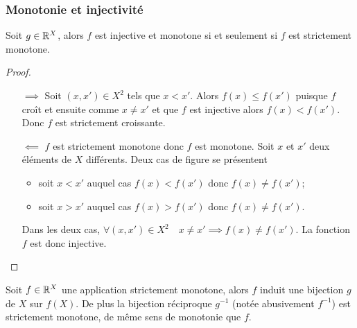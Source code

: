 \subsubsection{Monotonie et injectivité}
\begin{theo}
  Soit \(g \in \mathbb{R}^X\), alors \(f\) est injective et monotone si et seulement si 
  \(f\) est strictement monotone.
\end{theo}
\begin{proof}
  \begin{itemize}
    \item[\(\implies\)] Soit \((x,x') \in X^2\) tels que \(x < x'\). Alors 
      \(f(x) \leqslant f(x')\) puisque \(f\) croît et ensuite comme \(x \neq 
      x'\) et que \(f\) est injective alors \(f(x) < f(x')\). Donc \(f\) est 
      strictement croissante.
    \item[\(\impliedby\)] \(f\) est strictement monotone donc \(f\) est 
      monotone. Soit \(x\) et \(x'\) deux éléments de \(X\) différents. Deux cas 
      de figure se présentent
      \begin{itemize}
        \item soit \(x < x'\) auquel cas \(f(x) < f(x')\) donc \(f(x) \neq 
          f(x')\);
        \item soit \(x > x'\) auquel cas \(f(x) > f(x')\) donc \(f(x) \neq 
          f(x')\).
      \end{itemize}
      Dans les deux cas, \(\forall (x,x') \in X^2 \quad x \neq x' \implies f(x) 
      \neq f(x')\). La fonction \(f\) est donc injective.
  \end{itemize}
\end{proof}
\begin{cor}
  Soit \(f \in \mathbb{R}^X\) une application strictement monotone, alors \(f\) induit 
  une bijection \(g\) de \(X\) sur \(f(X)\). De plus la bijection réciproque 
  \(g^{-1}\) (notée abusivement \(f^{-1}\)) est strictement monotone, de même 
  sens de monotonie que \(f\).
\end{cor}
